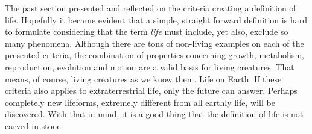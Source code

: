 The past section presented and reflected on the criteria creating a definition of life. Hopefully it became evident that a simple, straight forward definition is hard to formulate considering that the term \textit{life} must include, yet also, exclude so many phenomena. Although there are tons of non-living examples on each of the presented criteria, the combination of properties concerning growth, metabolism, reproduction, evolution and motion are a valid basis for living creatures. That means, of course, living creatures as we know them. Life on Earth. If these criteria also applies to extraterrestrial life, only the future can answer. Perhaps completely new lifeforms, extremely different from all earthly life, will be discovered. With that in mind, it is a good thing that the definition of life is not carved in stone.   
































